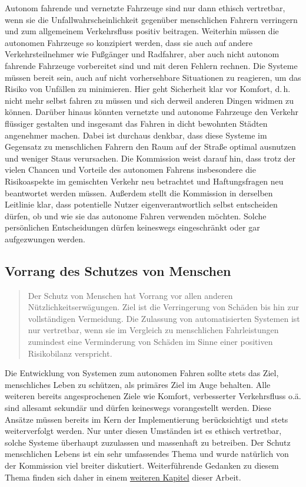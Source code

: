\documentclass[twoside,a4paper,12pt]{article}
\begin{document}
Autonom fahrende und vernetzte Fahrzeuge sind nur dann ethisch vertretbar,
wenn sie die Unfallwahrscheinlichkeit gegenüber menschlichen Fahrern verringern und zum allgemeinem Verkehrsfluss positiv beitragen.
Weiterhin müssen die autonomen Fahrzeuge so konzipiert werden, dass sie auch auf andere Verkehrsteilnehmer wie Fußgänger und 
Radfahrer, aber auch nicht autonom fahrende Fahrzeuge vorbereitet sind und mit deren Fehlern rechnen. Die Systeme müssen bereit 
sein, auch auf nicht vorhersehbare Situationen zu reagieren, um das Risiko von Unfällen zu minimieren. Hier 
geht Sicherheit klar vor Komfort, d.\,h. nicht mehr selbst fahren zu müssen und sich derweil anderen Dingen widmen zu können.
Darüber hinaus könnten
vernetzte und autonome Fahrzeuge den Verkehr flüssiger gestalten und insgesamt das Fahren in dicht bewohnten Städten angenehmer machen. 
Dabei ist durchaus denkbar, dass diese Systeme im Gegensatz zu menschlichen Fahrern den Raum auf der Straße optimal ausnutzen und weniger Staus verursachen.
Die Kommission weist darauf hin, dass trotz der vielen Chancen und Vorteile des autonomen Fahrens insbesondere die Risikoaspekte im gemischten Verkehr neu 
betrachtet und Haftungsfragen neu beantwortet werden müssen. Außerdem stellt die Kommission in derselben Leitlinie klar, dass potentielle Nutzer eigenverantwortlich selbst entscheiden dürfen, ob und wie sie das autonome Fahren verwenden möchten. Solche persönlichen Entscheidungen dürfen keineswegs eingeschränkt oder gar
aufgezwungen werden.\\

\subsection{Vorrang des Schutzes von Menschen} \label{VorrangDesSchutzesVonMenschen}

\begin{quote}
\glqq
Der Schutz von Menschen hat Vorrang vor allen anderen Nützlichkeitserwägungen. Ziel
ist die Verringerung von Schäden bis hin zur vollständigen Vermeidung. Die Zulassung
von automatisierten Systemen ist nur vertretbar, wenn sie im Vergleich zu menschlichen
Fahrleistungen zumindest eine Verminderung von Schäden im Sinne einer positiven Risikobilanz verspricht.\grqq\mbox{~\cite[S. 10]{ek}}
\end{quote}

Die Entwicklung von Systemen zum autonomen Fahren sollte stets das Ziel, menschliches Leben zu schützen, 
als primäres Ziel im Auge behalten. Alle weiteren bereits angesprochenen Ziele wie Komfort, verbesserter Verkehrsfluss o.\;ä. sind allesamt sekundär 
und dürfen keineswegs vorangestellt werden. Diese Ansätze müssen bereits im Kern der Implementierung berücksichtigt und stets weiterverfolgt werden. Nur unter 
diesen Umständen ist es ethisch vertretbar, solche Systeme überhaupt zuzulassen und massenhaft zu betreiben. Der Schutz menschlichen Lebens ist ein sehr umfassendes Thema und wurde natürlich von der Kommission viel breiter diskutiert. Weiterführende Gedanken zu diesem Thema finden sich daher in einem \hyperlink{target1}{weiteren Kapitel} dieser Arbeit.\\
\end{document}
